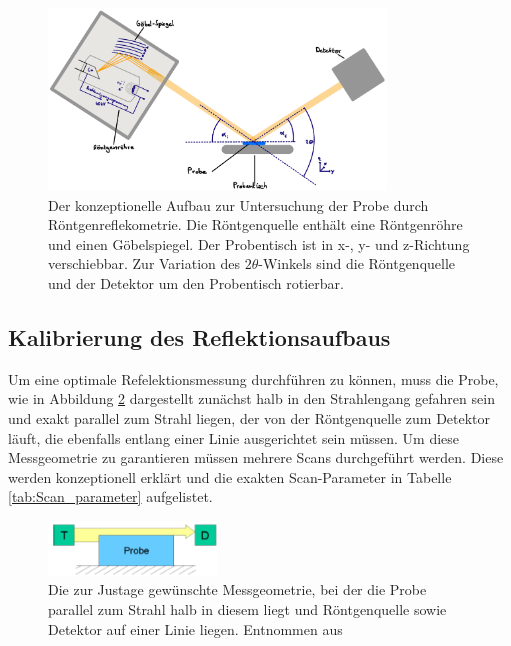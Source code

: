         \FloatBarrier

        \begin{figure}[h]
          \centering
          \includegraphics[width = 0.8\textwidth]{pictures/Aufbau.png}
          \caption{Der konzeptionelle Aufbau zur Untersuchung der Probe durch Röntgenreflekometrie. Die Röntgenquelle enthält eine Röntgenröhre und einen Göbelspiegel. Der Probentisch ist in x-, y- und z-Richtung verschiebbar. Zur Variation des $2\theta$-Winkels sind die Röntgenquelle und der Detektor um den Probentisch rotierbar.}
          \label{fig:Aufbau}
        \end{figure}
    
        \FloatBarrier

    

    \subsection{Kalibrierung des Reflektionsaufbaus}
        Um eine optimale Refelektionsmessung durchführen zu können, muss die Probe, wie in Abbildung \ref{fig:parallel} dargestellt zunächst halb in den Strahlengang gefahren sein und exakt parallel zum Strahl 
        liegen, der 
        von der Röntgenquelle zum Detektor läuft, die ebenfalls entlang einer Linie ausgerichtet sein müssen. Um diese Messgeometrie zu garantieren müssen mehrere Scans durchgeführt werden. Diese werden 
        konzeptionell erklärt und die exakten Scan-Parameter in Tabelle \ref{tab:Scan_parameter} aufgelistet.\newline

        \FloatBarrier
        \begin{figure}[h]
            \centering
            \includegraphics[width = 0.4\textwidth]{pictures/probe_parallel.png}
            \caption{Die zur Justage gewünschte Messgeometrie, bei der die Probe parallel zum Strahl halb in diesem liegt und Röntgenquelle sowie Detektor auf einer Linie liegen. Entnommen aus \cite{tu_dortmund_versuchsanleitung_2022}}
            \label{fig:parallel}
          \end{figure}
      
